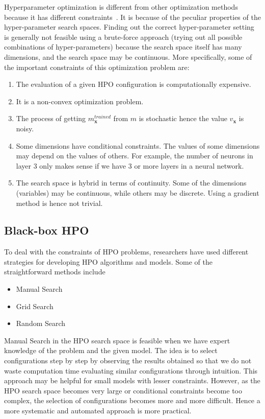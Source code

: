 \documentclass[11pt]{report}
\begin{document}
Hyperparameter optimization is different from other optimization methods because it has different constraints~\cite{bayesianOptimizationTutorial}.
It is because of the peculiar properties of the hyper-parameter search spaces.
Finding out the correct hyper-parameter setting is generally not feasible using a brute-force approach (trying out all possible combinations of hyper-parameters) because the search space itself has many dimensions, and the search space may be continuous.
More specifically,  some of the important constraints of this optimization problem are:

\begin{enumerate}
\item The evaluation of a given HPO configuration is computationally expensive.
\item It is a non-convex optimization problem.
\item The process of getting $m^{trained}_\textbf{x}$ from $m$ is stochastic hence the value $v_{\textbf{x}}$ is noisy.
\item Some dimensions have conditional constraints. The values of some dimensions may depend on the values of others. For example, the number of neurons in layer 3 only makes sense if we have 3 or more layers in a neural network.
\item The search space is hybrid in terms of continuity. Some of the dimensions (variables) may be continuous, while others may be discrete.
Using a gradient method is hence not trivial.
\end{enumerate}

\subsection{Black-box HPO}
To deal with the constraints of HPO problems, researchers have used different strategies for developing HPO algorithms and models.
Some of the straightforward methods include
\begin{itemize}
\item Manual Search
\item Grid Search
\item Random Search
\end{itemize}


Manual Search in the HPO search space is feasible when we have expert knowledge of the problem and the given model. 
The idea is to select configurations step by step by observing the results obtained
so that we do not waste computation time evaluating similar configurations through intuition.
This approach may be helpful for small models with lesser constraints.
However, as the HPO search space becomes very large or conditional constraints become too complex, the selection of configurations becomes more and more difficult.
Hence a more systematic and automated approach is more practical.
\end{document}
